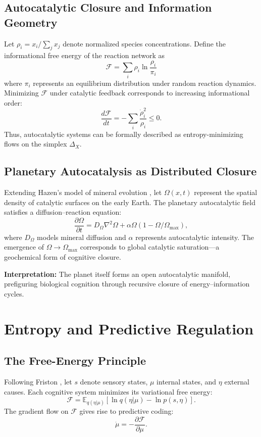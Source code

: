 \documentclass[11pt,a4paper]{article}
\begin{document}
\subsection{Autocatalytic Closure and Information Geometry}

Let $\rho_i = x_i / \sum_j x_j$ denote normalized species concentrations.  
Define the informational free energy of the reaction network as
\[
\mathcal{F} = \sum_i \rho_i \ln \frac{\rho_i}{\pi_i}
\]
where $\pi_i$ represents an equilibrium distribution under random reaction dynamics.  
Minimizing $\mathcal{F}$ under catalytic feedback corresponds to increasing informational order:
\[
\frac{d\mathcal{F}}{dt} = -\sum_i \frac{\dot{\rho}_i^2}{\rho_i} \le 0.
\]
Thus, autocatalytic systems can be formally described as entropy-minimizing flows on the simplex $\Delta_X$.

\subsection{Planetary Autocatalysis as Distributed Closure}

Extending Hazen’s model of mineral evolution \citep{Hazen2008MineralEvolution}, let $\Omega(x,t)$ represent the spatial density of catalytic surfaces on the early Earth.  The planetary autocatalytic field satisfies a diffusion–reaction equation:
\[
\frac{\partial \Omega}{\partial t} = D_\Omega \nabla^2 \Omega + \alpha \Omega(1 - \Omega / \Omega_{\max}),
\]
where $D_\Omega$ models mineral diffusion and $\alpha$ represents autocatalytic intensity.  
The emergence of $\Omega \to \Omega_{\max}$ corresponds to global catalytic saturation—a geochemical form of cognitive closure.

\vspace{1em}
\noindent \textbf{Interpretation:} The planet itself forms an open autocatalytic manifold, prefiguring biological cognition through recursive closure of energy–information cycles.

\section{Entropy and Predictive Regulation}
\label{app:entropy-prediction}

\subsection{The Free-Energy Principle}

Following Friston \citep{Friston2010FreeEnergyPrinciple, Friston2013LifeAsWeKnowIt}, let $s$ denote sensory states, $\mu$ internal states, and $\eta$ external causes.  
Each cognitive system minimizes its variational free energy:
\[
\mathcal{F} = \mathbb{E}_{q(\eta|\mu)}[\ln q(\eta|\mu) - \ln p(s, \eta)].
\]
The gradient flow on $\mathcal{F}$ gives rise to predictive coding:
\[
\dot{\mu} = -\frac{\partial \mathcal{F}}{\partial \mu}.
\]
\end{document}
